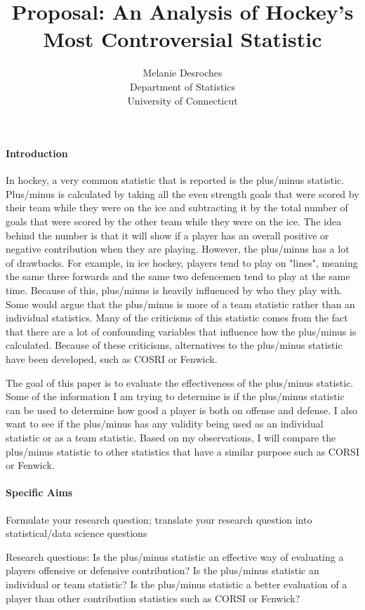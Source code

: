 \documentclass[12pt]{article}
\title{Proposal: An Analysis of Hockey's Most Controversial Statistic}
\author{Melanie Desroches\\
  Department of Statistics\\
  University of Connecticut
}
\begin{document}
\maketitle


\paragraph{Introduction}
In hockey, a very common statistic that is reported is the plus/minus statistic. Plus/minus is calculated
by taking all the even strength goals that were scored by their team while they were on the ice and subtracting
it by the total number of goals that were scored by the other team while they were on the ice. The idea behind 
the number is that it will show if a player has an overall positive or negative contribution when they are playing. 
However, the plus/minus has a lot of drawbacks. For example, in ice hockey, players tend to play on "lines", meaning 
the same three forwards and the same two defencemen tend to play at the same time. Because of this, plus/minus is heavily 
influenced by who they play with. Some would argue that the plus/minus is more of a team statistic rather than an 
individual statistics. Many of the criticisms of this statistic comes from the fact that there are a lot of confounding 
variables that influence how the plus/minus is calculated. Because of these criticisms, alternatives to the plus/minus
statistic have been developed, such as COSRI or Fenwick.

The goal of this paper is to evaluate the effectiveness of the plus/minus statistic. Some of the information
I am trying to determine is if the plus/minus statistic can be used to determine how good a player is both on
offense and defense. I also want to see if the plus/minus has any validity being used as an individual
statistic or as a team statistic. Based on my observations, I will compare the plus/minus statistic to other
statistics that have a similar purpose such as CORSI or Fenwick.

\paragraph{Specific Aims}
Formulate your research question;
translate your research question into statistical/data science questions

Research questions:
Is the plus/minus statistic an effective way of evaluating a players offensive or defensive
contribution?
Is the plus/minus statistic an individual or team statistic?
Is the plus/minus statistic a better evaluation of a player than other contribution statistics
such as CORSI or Fenwick?
\end{document}
